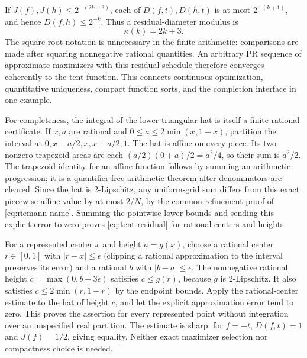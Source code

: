 If \(J(f),J(h)\leq2^{-(2k+3)}\), each of \(D(f,t),D(h,t)\) is at most \(2^{-(k+1)}\), and hence \(D(f,h)\leq2^{-k}\). Thus a residual-diameter modulus is
\[
  \kappa(k)=2k+3.
\]
The square-root notation is unnecessary in the finite arithmetic: comparisons are made after squaring nonnegative rational quantities. An arbitrary PR sequence of approximate maximizers with this residual schedule therefore converges coherently to the tent function. This connects continuous optimization, quantitative uniqueness, compact function sorts, and the completion interface in one example.

For completeness, the integral of the lower triangular hat is itself a finite rational certificate. If \(x,a\) are rational and \(0\leq a\leq2\min(x,1-x)\), partition the interval at \(0,x-a/2,x,x+a/2,1\). The hat is affine on every piece. Its two nonzero trapezoid areas are each \((a/2)(0+a)/2=a^2/4\), so their sum is \(a^2/2\). The trapezoid identity for an affine function follows by summing an arithmetic progression; it is a quantifier-free arithmetic theorem after denominators are cleared. Since the hat is 2-Lipschitz, any uniform-grid sum differs from this exact piecewise-affine value by at most \(2/N\), by the common-refinement proof of \eqref{eq:riemann-name}. Summing the pointwise lower bounds and sending this explicit error to zero proves \eqref{eq:tent-residual} for rational centers and heights.

For a represented center \(x\) and height \(a=g(x)\), choose a rational center \(r\in[0,1]\) with \(|r-x|\leq\epsilon\) (clipping a rational approximation to the interval preserves its error) and a rational \(b\) with \(|b-a|\leq\epsilon\). The nonnegative rational height \(c=\max(0,b-3\epsilon)\) satisfies \(c\leq g(r)\), because \(g\) is 2-Lipschitz. It also satisfies \(c\leq2\min(r,1-r)\) by the endpoint bounds. Apply the rational-center estimate to the hat of height \(c\), and let the explicit approximation error tend to zero. This proves the assertion for every represented point without integration over an unspecified real partition. The estimate is sharp: for \(f=-t\), \(D(f,t)=1\) and \(J(f)=1/2\), giving equality. Neither exact maximizer selection nor compactness choice is needed.

